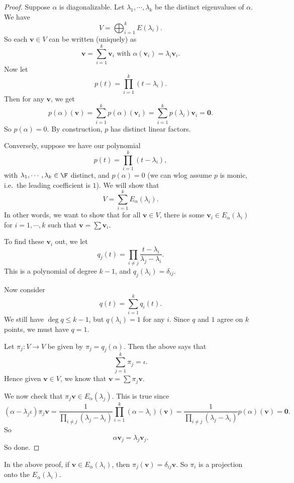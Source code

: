 \documentclass[a4paper]{article}
\begin{document}
\begin{proof}
  Suppose $\alpha$ is diagonalizable. Let $\lambda_1, \cdots, \lambda_k$ be the distinct eigenvalues of $\alpha$. We have
  \[
    V = \bigoplus_{i = 1}^k E(\lambda_i).
  \]
  So each $\mathbf{v} \in V$ can be written (uniquely) as
  \[
    \mathbf{v} = \sum_{i = 1}^k \mathbf{v}_i \text{ with }\alpha(\mathbf{v}_i) = \lambda_i \mathbf{v}_i.
  \]
  Now let
  \[
    p(t) = \prod_{i = 1}^k (t - \lambda_i).
  \]
  Then for any $\mathbf{v}$, we get
  \[
    p(\alpha) (\mathbf{v}) = \sum_{i = 1}^k p(\alpha) (\mathbf{v}_i) = \sum_{i = 1}^k p(\lambda_i) \mathbf{v}_i = \mathbf{0}.
  \]
  So $p(\alpha) = 0$. By construction, $p$ has distinct linear factors.

  Conversely, suppose we have our polynomial
  \[
    p(t) = \prod_{i = 1}^k (t - \lambda_i),
  \]
  with $\lambda_1, \cdots, \lambda_k \in \F$ distinct, and $p(\alpha) = 0$ (we can wlog assume $p$ is monic, i.e.\ the leading coefficient is $1$). We will show that
  \[
    V = \sum_{i = 1}^k E_\alpha(\lambda_i).
  \]
  In other words, we want to show that for all $\mathbf{v} \in V$, there is some $\mathbf{v}_i \in E_\alpha(\lambda_i)$ for $i = 1, \cdots, k$ such that $\mathbf{v} = \sum \mathbf{v}_i$.

  To find these $\mathbf{v}_i$ out, we let
  \[
    q_j(t) = \prod_{i \not= j} \frac{t - \lambda_i}{\lambda_j - \lambda_i}.
  \]
  This is a polynomial of degree $k - 1$, and $q_j(\lambda_i) = \delta_{ij}$.

  Now consider
  \[
    q(t) = \sum_{i = 1}^k q_i(t).
  \]
  We still have $\deg q \leq k - 1$, but $q(\lambda_i) = 1$ for any $i$. Since $q$ and $1$ agree on $k$ points, we must have $q = 1$.

  Let $\pi_j: V\to V$ be given by $\pi_j = q_j(\alpha)$. Then the above says that
  \[
    \sum_{j = 1}^k \pi_j = \iota.
  \]
  Hence given $\mathbf{v} \in V$, we know that $\mathbf{v} = \sum \pi_j \mathbf{v}$.

  We now check that $\pi_j \mathbf{v} \in E_\alpha (\lambda_j)$. This is true since
  \[
    (\alpha - \lambda_j\iota) \pi_j \mathbf{v} =\frac{1}{\prod_{i \not= j}(\lambda_j - \lambda_i)} \prod_{i = 1}^k (\alpha - \lambda_\iota) (\mathbf{v}) = \frac{1}{\prod_{i \not= j}(\lambda_j - \lambda_i)} p(\alpha) (\mathbf{v}) = \mathbf{0}.
  \]
  So
  \[
    \alpha \mathbf{v}_j = \lambda_j \mathbf{v}_j.
  \]
  So done.
\end{proof}
In the above proof, if $\mathbf{v} \in E_\alpha(\lambda_i)$, then $\pi_j(\mathbf{v}) = \delta_{ij}\mathbf{v}$. So $\pi_i$ is a projection onto the $E_\alpha(\lambda_i)$.
\end{document}
